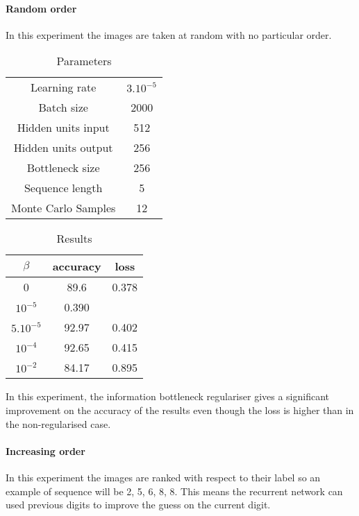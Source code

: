 \documentclass[10pt,oneside,openright]{report}
\begin{document}
\paragraph{Random order}
In this experiment the images are taken at random with no particular order.

\begin {table}[H]
\begin{center}
\begin{tabular}{ c | c  }
 Learning rate & $3.10^{-5}$ \\
 Batch size & 2000\\
 Hidden units input & 512 \\
 Hidden units output & 256 \\
 Bottleneck size & 256 \\
 Sequence length & 5 \\
Monte Carlo Samples & 12\\
\end{tabular}
\end{center}
\caption{Parameters}
\end {table}

\begin {table}[H]
\begin{center}
\begin{tabular}{ c | c c }
 $\beta$  & accuracy & loss \\
 \hline
0  & 89.6 & 0.378 \\
$10^{-5}$  & 0.390 & \\
$5.10^{-5}$  & 92.97& 0.402 \\
$10^{-4}$  & 92.65 & 0.415 \\
$10^{-2}$  & 84.17 & 0.895 \\
\end{tabular}
\end{center}
\caption{Results}
\end {table}

In this experiment, the information bottleneck regulariser gives a significant improvement on the accuracy of the results even though the loss is higher than in the non-regularised case.  

\paragraph{Increasing order}
In this experiment the images are ranked with respect to their label so an example of sequence will be 2, 5, 6, 8, 8. This means the recurrent network can used previous digits to improve the guess on the current digit.
\end{document}
